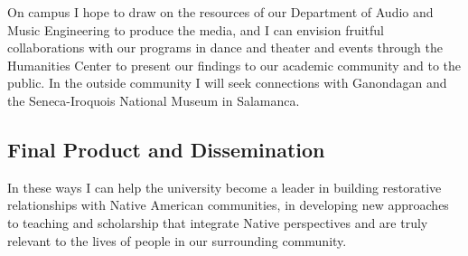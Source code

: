 \documentclass{neh}
\begin{document}
On campus I hope to draw on the resources of our Department of Audio and Music
Engineering to produce the media, and I can envision fruitful collaborations
with our programs in dance and theater and events through the Humanities
Center to present our findings to our academic community and to the public.
In the outside community I will seek connections with Ganondagan and the
Seneca-Iroquois National Museum in Salamanca.

\subsection{Final Product and Dissemination}


In these ways I can help the university become a leader in building restorative
relationships with Native American communities, in developing new approaches
to teaching and scholarship that integrate Native perspectives and are truly
relevant to the lives of people in our surrounding community.
\end{document}

